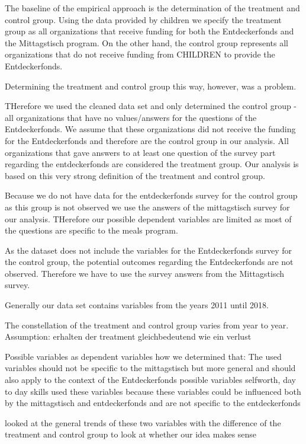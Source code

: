 \documentclass[12pt, a4paper]{article}\usepackage[]{graphicx}\usepackage[]{color}
\begin{document}
The baseline of the empirical approach is the determination of the treatment and control group. Using the data provided by children we specify the treatment group as all organizations that receive funding for both the Entdeckerfonds and the Mittagstisch program. On the other hand, the control group represents all organizations that do not receive funding from CHILDREN to provide the Entdeckerfonds.

Determining the treatment and control group this way, however, was a problem.

THerefore we used the cleaned data set and only determined the control group - all organizations that have no values/answers for the questions of the Entdeckerfonds. We assume that these organizations did not receive the funding for the Entdeckerfonds and therefore are the control group in our analysis. All organizations that gave answers to at least one question of the survey part regarding the entdeckerfonds are considered the treatment group. 
Our analysis is based on this very strong definition of the treatment and control group.

Because we do not have data for the entdeckerfonds survey for the control group as this group is not observed we use the answers of the mittagstisch survey for our analysis. THerefore our possible dependent variables are limited as most of the questions are specific to the meals program. 

As the dataset does not include the variables for the Entdeckerfonds survey for the control group, the potential outcomes regarding the Entdeckerfonds are not observed. Therefore we have to use the survey answers from the Mittagstisch survey.

Generally our data set contains variables from the years 2011 until 2018. 

The constellation of the treatment and control group varies from year to year. 
Assumption: erhalten der treatment gleichbedeutend wie ein verlust

Possible variables as dependent variables
how we determined that:
The used variables should not be specific to the mittagstisch but more general and should also apply to the context of the Entdeckerfonds
possible variables selfworth, day to day skills
used these variables because these variables could be influenced both by the mittagstisch and entdeckerfonds and are not specific to the entdeckerfonds

looked at the general trends of these two variables with the difference of the treatment and control group to look at whether our idea makes sense
\end{document}
